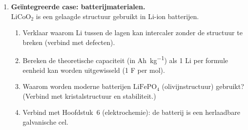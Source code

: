 \begin{enumerate}
\item \textbf{Ge\"integreerde case: batterijmaterialen.} \\
$\mathrm{LiCoO_2}$ is een gelaagde structuur gebruikt in Li-ion batterijen.
\begin{enumerate}
\item[(a)] Verklaar waarom Li tussen de lagen kan intercaler zonder de structuur te breken (verbind met defecten).
\item[(b)] Bereken de theoretische capaciteit (in \si{Ah\per\kilogram}) als 1 Li per formule eenheid kan worden uitgewisseld (1 F per mol).
\item[(c)] Waarom worden moderne batterijen $\mathrm{LiFePO_4}$ (olivijnstructuur) gebruikt? (Verbind met kristalstructuur en stabiliteit.)
\item[(d)] Verbind met Hoofdstuk~6 (elektrochemie): de batterij is een herlaadbare galvanische cel.
\end{enumerate}

\end{enumerate}